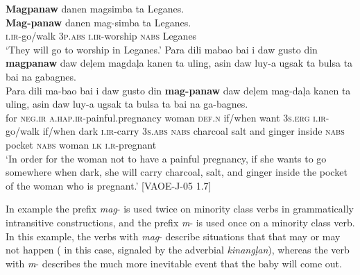 \ea
\label{bkm:Ref63688177}
\textbf{Magpanaw}  danen   magsimba  ta  Leganes. \\\smallskip
 \gll \textbf{Mag-panaw}  danen   mag-simba  ta  Leganes. \\
\textsc{i.ir}-go/walk  3\textsc{p.abs}  \textsc{i.ir}-worship  \textsc{nabs}  Leganes \\
\glt ‘They will go to worship in Leganes.’
\z
\ea
\label{bkm:Ref63688194}
Para  dili  mabao   bai  i  daw  gusto  din \textbf{magpanaw}  daw  deļem  magdaļa  kanen  ta  uling,  asin  daw luy-a  ugsak  ta  bulsa  ta  bai  na  gabagnes. \\\smallskip
 \gll Para  dili  ma-bao\footnotemark{}   bai  i  daw  gusto  din \textbf{mag-panaw}  daw  deļem  mag-daļa  kanen  ta  uling,  asin  daw luy-a  ugsak  ta  bulsa  ta  bai  na  ga-bagnes. \\
for \textsc{neg.ir}  \textsc{a.hap.ir}-painful.pregnancy  woman \textsc{def.n}  if/when  want  3\textsc{s.erg}
\textsc{i.ir}-go/walk  if/when  dark  \textsc{i.ir}-carry  3\textsc{s.abs}  \textsc{nabs} charcoal  salt  and
ginger  inside  \textsc{nabs}  pocket  \textsc{nabs}  woman  \textsc{lk}  \textsc{i.r}-pregnant \\
\glt `In order for the woman not to have a painful pregnancy, if she wants to go somewhere when dark, she will carry charcoal, salt, and ginger inside the pocket of the woman who is pregnant.’ [VAOE-J-05 1.7]
\z

In example  the prefix \textit{mag}{}- is used twice on minority class verbs in grammatically intransitive constructions, and the prefix \textit{m}{}- is used once on a minority class verb. In this example, the verbs with \textit{mag}{}- describe situations that that may or may not happen ( in this case, signaled by the adverbial \textit{kinangļan}), whereas the verb with \textit{m}{}- describes the much more inevitable event that the baby will come out.

